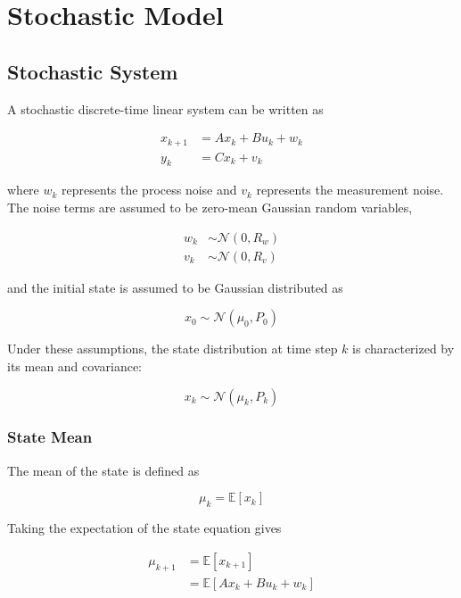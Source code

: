 \chapter{Stochastic Model}

\section{Stochastic System}
\label{sec:stochastic_system}

A stochastic discrete-time linear system can be written as

\begin{align}
    x_{k+1} &= Ax_k + Bu_k + w_k
    \label{eq:stochastic_state}\\
    y_k &= Cx_k + v_k
    \label{eq:stochastic_output}
\end{align}

where \(w_k\) represents the process noise and \(v_k\) represents the measurement noise. The noise terms are assumed to be zero-mean Gaussian random variables,

\begin{align}
    w_k &\sim \mathcal{N}(0,R_w)\\
    v_k &\sim \mathcal{N}(0,R_v)
\end{align}

and the initial state is assumed to be Gaussian distributed as

\begin{equation}
    x_0 \sim \mathcal{N}(\mu_0,P_0)
\end{equation}

Under these assumptions, the state distribution at time step \(k\) is characterized by its mean and covariance:

\begin{equation}
    x_k \sim \mathcal{N}(\mu_k,P_k)
\end{equation}

\subsection{State Mean}

The mean of the state is defined as

\begin{equation}
    \mu_k = \mathbb{E}[x_k]
\end{equation}

Taking the expectation of the state equation gives

\begin{align}
    \mu_{k+1}
    &=
    \mathbb{E}[x_{k+1}] \\
    &=
    \mathbb{E}[Ax_k+Bu_k+w_k]
\end{align}

